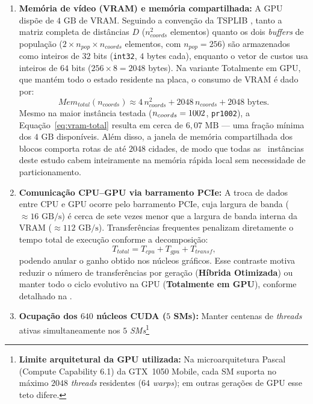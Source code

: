 \begin{enumerate}
      \item
            \textbf{Memória de vídeo (VRAM) e memória compartilhada:} A GPU dispõe de \(4\text{ GB}\) de VRAM.
            Seguindo a convenção da TSPLIB \autocite{reinelt1991tsplib}, tanto a matriz completa de distâncias \(D\) (\(n_{coords}^2\) elementos) quanto os dois \emph{buffers} de população (\(2 \times n_{pop} \times n_{coords}\) elementos, com \(n_{pop} = 256\)) são armazenados como inteiros de \(32\) bits (\texttt{int32}, \(4\) bytes cada), enquanto o vetor de custos usa inteiros de \(64\) bits (\(256 \times 8 = 2048\) bytes).
            Na variante Totalmente em GPU, que mantém todo o estado residente na placa, o consumo de VRAM é dado por:
            \begin{equation}\label{eq:vram-total}
                  Mem_{total}(n_{coords}) \approx 4\,n_{coords}^2 + 2048\,n_{coords} + 2048 \text{ bytes.}
            \end{equation}
            Mesmo na maior instância testada (\(n_{coords} = 1002\), \texttt{pr1002}), a Equação~\eqref{eq:vram-total} resulta em cerca de \(6{,}07\text{ MB}\) --- uma fração mínima dos \(4\text{ GB}\) disponíveis.
            Além disso, a janela de memória compartilhada dos blocos comporta rotas de até \(2048\) cidades, de modo que todas as \totalinstancias\ instâncias deste estudo cabem inteiramente na memória rápida local sem necessidade de particionamento.
      \item
            \textbf{Comunicação CPU--GPU via barramento PCIe:} A troca de dados entre CPU e GPU ocorre pelo barramento PCIe, cuja largura de banda (\(\approx 16\text{ GB/s}\)) é cerca de sete vezes menor que a largura de banda interna da VRAM (\(\approx 112\text{ GB/s}\)).
            Transferências frequentes penalizam diretamente o tempo total de execução conforme a decomposição:
            \begin{equation}\label{eq:tempo-total}
                  T_{total} = T_{cpu} + T_{gpu} + T_{transf}\text{,}
            \end{equation}
            podendo anular o ganho obtido nos núcleos gráficos.
            Esse contraste motiva reduzir o número de transferências por geração (\textbf{Híbrida Otimizada}) ou manter todo o ciclo evolutivo na GPU (\textbf{Totalmente em GPU}), conforme detalhado na .
      \item
            \textbf{Ocupação dos \(640\) núcleos CUDA (\(5\) SMs):} Manter centenas de \emph{threads} ativas simultaneamente nos \(5\) \emph{SMs}\footnote{\textbf{Limite arquitetural da GPU utilizada:} Na microarquitetura Pascal (Compute Capability 6.1) da GTX~1050 Mobile, cada SM suporta no máximo \(2048\) \emph{threads} residentes (\(64\) \emph{warps}); em outras gerações de GPU esse teto difere.
}
\end{enumerate}
